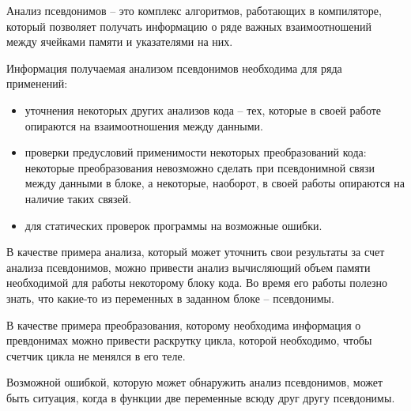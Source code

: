





\Intro


\begin{mydefinition}
Анализ псевдонимов -- это комплекс алгоритмов, работающих в компиляторе, который позволяет получать информацию о ряде важных взаимоотношений между ячейками памяти и указателями на них.
\end{mydefinition}

Информация получаемая анализом псевдонимов необходима для ряда применений:
\begin{itemize}
\item уточнения некоторых других анализов кода -- тех, которые в своей работе опираются на взаимоотношения между данными.
\item проверки предусловий применимости некоторых преобразований кода:  некоторые преобразования невозможно сделать при псевдонимной связи между данными в блоке, а некоторые, наоборот, в своей работы опираются на наличие таких связей.
\item для статических проверок программы на возможные ошибки.
\end{itemize}

\begin{myexampless}
В качестве примера анализа, который может уточнить свои результаты за счет анализа псевдонимов, можно привести анализ вычисляющий объем памяти необходимой для работы некоторому блоку кода. Во время его работы полезно знать, что какие-то из переменных в заданном блоке -- псевдонимы.

В качестве примера преобразования, которому необходима информация о превдонимах можно привести раскрутку цикла, которой необходимо, чтобы счетчик цикла не менялся в его теле.

Возможной ошибкой, которую может обнаружить анализ псевдонимов, может быть ситуация, когда в функции две переменные всюду друг другу псевдонимы.
\end{myexampless}

